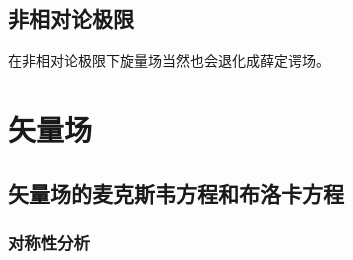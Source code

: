 \subsection{非相对论极限}

在非相对论极限下旋量场当然也会退化成薛定谔场。

\section{矢量场}


\subsection{矢量场的麦克斯韦方程和布洛卡方程}

\subsubsection{对称性分析}


